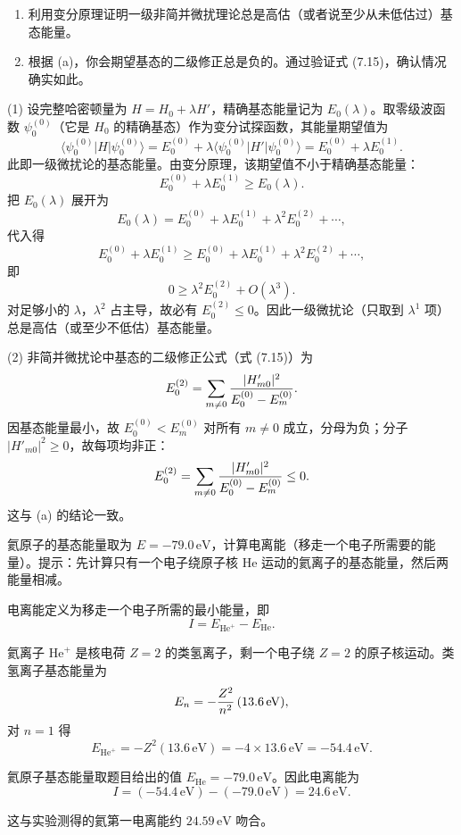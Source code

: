 \begin{question}
\begin{enumerate}
\item 利用变分原理证明一级非简并微扰理论总是高估（或者说至少从未低估过）基态能量。
\item 根据 (a)，你会期望基态的二级修正总是负的。通过验证式 (7.15)，确认情况确实如此。
\end{enumerate}

\par\smallskip
{}

\end{question}
\begin{solution}
(1) 设完整哈密顿量为 $H=H_0+\lambda H'$，精确基态能量记为 $E_0(\lambda)$。取零级波函数 $\psi_0^{(0)}$（它是 $H_0$ 的精确基态）作为变分试探函数，其能量期望值为
\[
\langle\psi_0^{(0)}|H|\psi_0^{(0)}\rangle
=E_0^{(0)}+\lambda\langle\psi_0^{(0)}|H'|\psi_0^{(0)}\rangle
=E_0^{(0)}+\lambda E_0^{(1)}.
\]
此即一级微扰论的基态能量。由变分原理，该期望值不小于精确基态能量：
\[
E_0^{(0)}+\lambda E_0^{(1)}\ge E_0(\lambda).
\]
把 $E_0(\lambda)$ 展开为
\[
E_0(\lambda)=E_0^{(0)}+\lambda E_0^{(1)}+\lambda^2 E_0^{(2)}+\cdots,
\]
代入得
\[
E_0^{(0)}+\lambda E_0^{(1)}\ge E_0^{(0)}+\lambda E_0^{(1)}+\lambda^2 E_0^{(2)}+\cdots,
\]
即
\[
0\ge\lambda^2 E_0^{(2)}+O(\lambda^3).
\]
对足够小的 $\lambda$，$\lambda^2$ 占主导，故必有 $E_0^{(2)}\le0$。因此一级微扰论（只取到 $\lambda^1$ 项）总是高估（或至少不低估）基态能量。

(2) 非简并微扰论中基态的二级修正公式（式 (7.15)）为
\[
E_0^{(2)}=\sum_{m\neq0}{|H'_{m0}|^2\over E_0^{(0)}-E_m^{(0)}}.
\]
因基态能量最小，故 $E_0^{(0)}<E_m^{(0)}$ 对所有 $m\ne0$ 成立，分母为负；分子 $|H'_{m0}|^2\ge0$，故每项均非正：
\[
E_0^{(2)}=\sum_{m\neq0}{|H'_{m0}|^2\over E_0^{(0)}-E_m^{(0)}}\le0.
\]
这与 (a) 的结论一致。
\end{solution}

\begin{question}
氦原子的基态能量取为 $E=-79.0\,\mathrm{eV}$，计算电离能（移走一个电子所需要的能量）。提示：先计算只有一个电子绕原子核 He 运动的氦离子的基态能量，然后两能量相减。
\end{question}
\begin{solution}
电离能定义为移走一个电子所需的最小能量，即
\[
I=E_{\mathrm{He}^+}-E_{\mathrm{He}}.
\]

氦离子 $\mathrm{He}^+$ 是核电荷 $Z=2$ 的类氢离子，剩一个电子绕 $Z=2$ 的原子核运动。类氢离子基态能量为
\[
E_n=-{Z^2\over n^2}\,(13.6\,\mathrm{eV}),
\]
对 $n=1$ 得
\[
E_{\mathrm{He}^+}=-Z^2(13.6\,\mathrm{eV})=-4\times13.6\,\mathrm{eV}=-54.4\,\mathrm{eV}.
\]

氦原子基态能量取题目给出的值 $E_{\mathrm{He}}=-79.0\,\mathrm{eV}$。因此电离能为
\[
I=(-54.4\,\mathrm{eV})-(-79.0\,\mathrm{eV})
=\boxed{24.6\,\mathrm{eV}}.
\]

这与实验测得的氦第一电离能约 $24.59\,\mathrm{eV}$ 吻合。
\end{solution}

